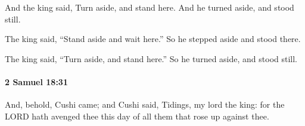 			\begin{versebox}
					\item[BHS] 
					\item[ASV] And the king said, Turn aside, and stand here. And he turned aside, and stood still.
					\item[NIV] The king said, “Stand aside and wait here.” So he stepped aside and stood there.
					\item[NRSV] The king said, “Turn aside, and stand here.” So he turned aside, and stood still.
			\end{versebox}

		\paragraph{2 Samuel 18:31} %
			\label{2SAMUEL-18-31}

			And, behold, Cushi came; and Cushi said, Tidings, my lord the king: for the LORD hath avenged thee this day of all them that rose up against thee.

